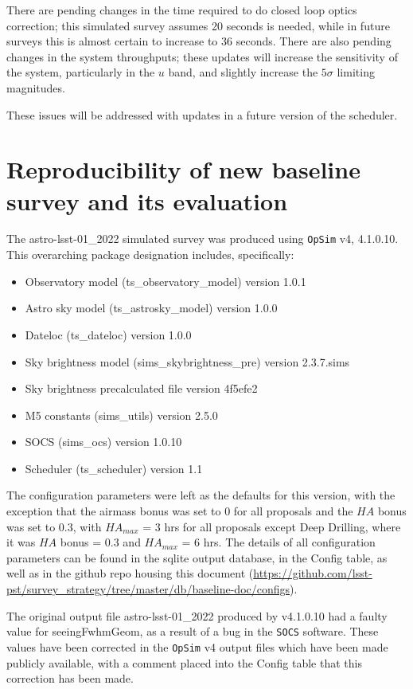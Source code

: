 \documentclass[DM,lsstdraft,authoryear,toc]{lsstdoc}
\newcommand{\opsim}{\texttt{OpSim}\xspace}
\newcommand{\socs}{\texttt{SOCS}\xspace}
\begin{document}
There are pending changes in the time required to do closed loop optics correction; this simulated survey assumes 20 seconds is needed, while in future surveys this is almost certain to increase to 36 seconds.  There are also pending changes in the system throughputs; these updates will increase the sensitivity of the system, particularly in the $u$ band, and slightly increase the $5\sigma$ limiting magnitudes. 

These issues will be addressed with updates in a future version of the scheduler.

\section{Reproducibility of new baseline survey and its evaluation}

The astro-lsst-01\_2022  simulated survey was produced using \opsim v4, 4.1.0.10.  This overarching package designation includes, specifically:
\begin{itemize}
\item Observatory model (ts\_observatory\_model) version 1.0.1
\item Astro sky model (ts\_astrosky\_model) version 1.0.0
\item Dateloc (ts\_dateloc) version 1.0.0
\item Sky brightness model (sims\_skybrightness\_pre) version 2.3.7.sims
\item Sky brightness precalculated file version 4f5efe2
\item M5 constants (sims\_utils) version 2.5.0 
\item SOCS (sims\_ocs) version 1.0.10
\item Scheduler (ts\_scheduler) version 1.1
\end{itemize}

The configuration parameters were left as the defaults for this version, with the exception that the airmass bonus was set to 0 for all proposals and the $HA$ bonus was set to 0.3, with $HA_{max}$ = 3 hrs for all proposals except Deep Drilling, where it was $HA$ bonus = 0.3 and $HA_{max}$ = 6 hrs. The details of all configuration parameters can be found in the sqlite output database, in the Config table, as well as in the github repo housing this document (\url{https://github.com/lsst-pst/survey_strategy/tree/master/db/baseline-doc/configs}).

The original output file astro-lsst-01\_2022 produced by v4.1.0.10 had a faulty value for seeingFwhmGeom, as a result of a bug in the \socs software. These values have been corrected in the \opsim v4 output files which have been made publicly available, with a comment placed into the Config table that this correction has been made.
\end{document}
